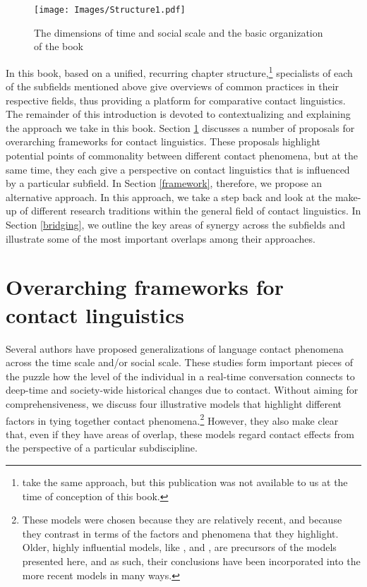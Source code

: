 \documentclass[output=paper]{langscibook}
\begin{document}
\begin{figure}
\caption{The dimensions of time and social scale and the basic organization of the book} \label{fig-structure1}
\centering
\texttt{[image: Images/Structure1.pdf]}
\label{figure1}
\end{figure}


In this book, based on a unified, recurring chapter structure,\footnote{\citet{adamouetal2021routledge} take the same approach, but this publication was not available to us at the time of conception of this book.} specialists of each of the subfields mentioned above give overviews of common practices in their respective fields, thus providing a platform for comparative contact linguistics. The remainder of this introduction is devoted to contextualizing and explaining the approach we take in this book. Section \ref{sec-connections} discusses a number of proposals for overarching frameworks for contact linguistics. These proposals highlight potential points of commonality between different contact phenomena, but at the same time, they each give a perspective on contact linguistics that is influenced by a particular subfield. In Section \ref{framework}, therefore, we propose an alternative approach. In this approach, we take a step back and look at the make-up of different research traditions within the general field of contact linguistics. In Section \ref{bridging}, we outline the key areas of synergy across the subfields and illustrate some of the most important overlaps among their approaches.

\section{Overarching frameworks for contact linguistics} \label{sec-connections}

 Several authors have proposed generalizations of language contact phenomena across the time scale and/or social scale. These studies form important pieces of the puzzle how the level of the individual in a real-time conversation connects to deep-time and society-wide historical changes due to contact. Without aiming for comprehensiveness, we discuss four illustrative models that highlight different factors in tying together contact phenomena.\footnote{These models were chosen because they are relatively recent, and because they contrast in terms of the factors and phenomena that they highlight. Older, highly influential models, like \citet{Weinreich1953Languages, thomasonetal1988language}, and \citet{van_coetsem_loan_1988}, are precursors of the models presented here, and as such, their conclusions have been incorporated into the more recent models in many ways.} However, they also make clear that, even if they have areas of overlap, these models regard contact effects from the perspective of a particular subdiscipline.
 
\end{document}
